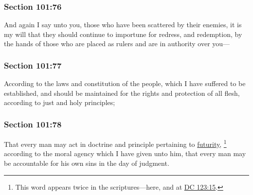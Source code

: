 	\subsubsection{Section 101:76} %
		\label{DC101-76}

		And again I say unto you, those who have been scattered by their enemies, it is my will that they should continue to importune for redress, and redemption, by the hands of those who are placed as rulers and are in authority over you---


	\subsubsection{Section 101:77} %
		\label{DC101-77}

		According to the laws and constitution of the people, which I have suffered to be established, and should be maintained for the rights and protection of all flesh, according to just and holy principles;


	\subsubsection{Section 101:78} %
		\label{DC101-78}

		That every man may act in doctrine and principle pertaining to \hyperref[FUTURITY]{futurity},%
			\footnote{%
				This word appears twice in the scriptures---here, and at \hyperref[DC123-15]{DC 123:15}.
				}
		according to the moral agency which I have given unto him, that every man may be accountable for his own sins in the day of judgment.


